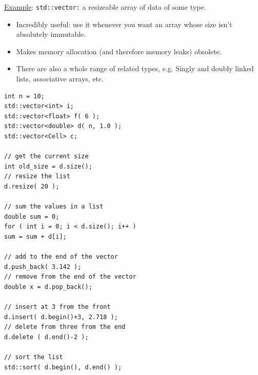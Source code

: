 \documentclass[11pt]{book} %
\begin{document}
\underline{Example}: \verb|std::vector:| a resize­able array of data of some type.
\begin{itemize}
\item Incredibly useful: use it whenever you want an array whose size isn’t absolutely immutable.
\item Makes memory allocation (and therefore memory leaks) obsolete.
\item There are also a whole range of related types, e.g. Singly and doubly linked lists, associative arrays, etc.
\end{itemize}

\begin{verbatim}
int n = 10;
std::vector<int> i;
std::vector<float> f( 6 );
std::vector<double> d( n, 1.0 );
std::vector<Cell> c;

// get the current size
int old_size = d.size();
// resize the list
d.resize( 20 );

// sum the values in a list
double sum = 0;
for ( int i = 0; i < d.size(); i++ )
sum = sum + d[i];

// add to the end of the vector
d.push_back( 3.142 );
// remove from the end of the vector
double x = d.pop_back();

// insert at 3 from the front
d.insert( d.begin()+3, 2.718 );
// delete from three from the end
d.delete ( d.end()-2 );

// sort the list
std::sort( d.begin(), d.end() );
\end{verbatim}
\end{document}
